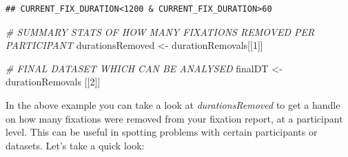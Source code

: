 \documentclass[]{book}
\newenvironment{Shaded}{\begin{snugshade}}{\end{snugshade}}
\newcommand{\CommentTok}[1]{\textcolor[rgb]{0.56,0.35,0.01}{\textit{#1}}}
\newcommand{\DecValTok}[1]{\textcolor[rgb]{0.00,0.00,0.81}{#1}}
\newcommand{\NormalTok}[1]{#1}
\newcommand{\StringTok}[1]{\textcolor[rgb]{0.31,0.60,0.02}{#1}}
\begin{document}
\begin{verbatim}
## CURRENT_FIX_DURATION<1200 & CURRENT_FIX_DURATION>60
\end{verbatim}

\begin{Shaded}
\begin{Highlighting}[]
\CommentTok{# SUMMARY STATS OF HOW MANY FIXATIONS REMOVED PER PARTICIPANT}
\NormalTok{durationsRemoved <-}\StringTok{ }\NormalTok{durationRemovals[[}\DecValTok{1}\NormalTok{]]}

\CommentTok{# FINAL DATASET WHICH CAN BE ANALYSED }
\NormalTok{finalDT <-}\StringTok{ }\NormalTok{durationRemovals [[}\DecValTok{2}\NormalTok{]]}
\end{Highlighting}
\end{Shaded}

In the above example you can take a look at \emph{durationsRemoved} to get a handle on how many fixations were removed from your fixation report, at a participant level. This can be useful in spotting problems with certain participants or datasets. Let's take a quick look:
\end{document}
